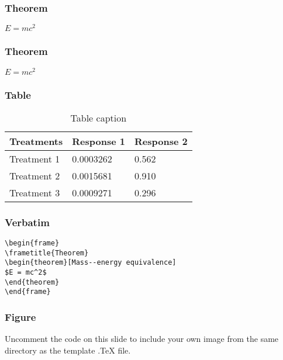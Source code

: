 \documentclass{beamer}
\begin{document}
\begin{frame}
\frametitle{Theorem}
\begin{theorem}
$E = mc^2$
\end{theorem}
\end{frame}


\begin{frame}
\frametitle{Theorem}
\begin{theorem}
$E = mc^2$
\end{theorem}
\end{frame}


\begin{frame}
\frametitle{Table}
\begin{table}
\begin{tabular}{l l l}
\toprule
\textbf{Treatments} & \textbf{Response 1} & \textbf{Response 2}\\
\midrule
Treatment 1 & 0.0003262 & 0.562 \\
Treatment 2 & 0.0015681 & 0.910 \\
Treatment 3 & 0.0009271 & 0.296 \\
\bottomrule
\end{tabular}
\caption{Table caption}
\end{table}
\end{frame}


\begin{frame}[fragile] %
\frametitle{Verbatim}
\begin{example}
\begin{verbatim}
\begin{frame}
\frametitle{Theorem}
\begin{theorem}[Mass--energy equivalence]
$E = mc^2$
\end{theorem}
\end{frame}\end{verbatim}
\end{example}
\end{frame}


\begin{frame}
\frametitle{Figure}
Uncomment the code on this slide to include your own image from the same directory as the template .TeX file.
\end{frame}
\end{document}
